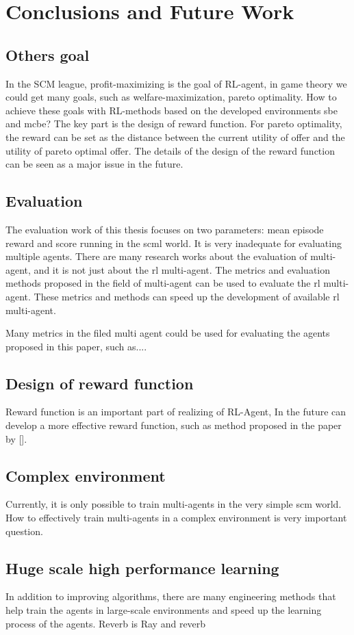 \chapter{Conclusions and Future Work}

\section{Others goal}
In the SCM league, profit-maximizing is the goal of RL-agent, in game theory we could get many goals, such as welfare-maximization, pareto optimality. How to achieve these goals with RL-methods based on the developed environments \gls{sbe} and \gls{mcbe}? The key part is the design of reward function. For pareto optimality, the reward can be set as the distance between the current utility of offer and the utility of pareto optimal offer. The details of the design of the reward function can be seen as a major issue in the future.

\section{Evaluation}
The evaluation work of this thesis focuses on two parameters: mean episode reward and score running in the \gls{scml} world. It is very inadequate for evaluating multiple agents. There are many research works about the evaluation of multi-agent, and it is not just about the \gls{rl} multi-agent.
The metrics and evaluation methods proposed in the field of multi-agent can be used to evaluate the \gls{rl} multi-agent. These metrics and methods can speed up the development of available \gls{rl} multi-agent. 

Many metrics in the filed multi agent could be used for evaluating the agents proposed in this paper, such as....

\section{Design of reward function}
Reward function is an important part of realizing of RL-Agent, In the future can develop a more effective reward function, such as method proposed in the paper by [].

\section{Complex environment}
Currently, it is only possible to train multi-agents in the very simple \gls{scm} world. How to effectively train multi-agents in a complex environment is very important question. 

\section{Huge scale high performance learning}
In addition to improving algorithms, there are many engineering methods that help train the agents in large-scale environments and speed up the learning process of the agents. Reverb is 
Ray and reverb
